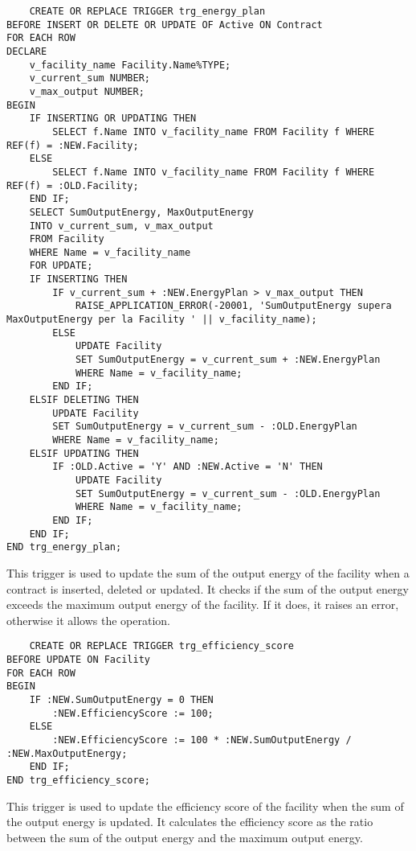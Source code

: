 \begin{lstlisting}
    CREATE OR REPLACE TRIGGER trg_energy_plan
BEFORE INSERT OR DELETE OR UPDATE OF Active ON Contract
FOR EACH ROW
DECLARE
    v_facility_name Facility.Name%TYPE;
    v_current_sum NUMBER;
    v_max_output NUMBER;
BEGIN
    IF INSERTING OR UPDATING THEN
        SELECT f.Name INTO v_facility_name FROM Facility f WHERE REF(f) = :NEW.Facility;
    ELSE
        SELECT f.Name INTO v_facility_name FROM Facility f WHERE REF(f) = :OLD.Facility;
    END IF;
    SELECT SumOutputEnergy, MaxOutputEnergy 
    INTO v_current_sum, v_max_output 
    FROM Facility 
    WHERE Name = v_facility_name 
    FOR UPDATE;
    IF INSERTING THEN
        IF v_current_sum + :NEW.EnergyPlan > v_max_output THEN
            RAISE_APPLICATION_ERROR(-20001, 'SumOutputEnergy supera MaxOutputEnergy per la Facility ' || v_facility_name);
        ELSE
            UPDATE Facility 
            SET SumOutputEnergy = v_current_sum + :NEW.EnergyPlan 
            WHERE Name = v_facility_name;
        END IF;
    ELSIF DELETING THEN
        UPDATE Facility 
        SET SumOutputEnergy = v_current_sum - :OLD.EnergyPlan 
        WHERE Name = v_facility_name;
    ELSIF UPDATING THEN
        IF :OLD.Active = 'Y' AND :NEW.Active = 'N' THEN
            UPDATE Facility 
            SET SumOutputEnergy = v_current_sum - :OLD.EnergyPlan 
            WHERE Name = v_facility_name;
        END IF;
    END IF;
END trg_energy_plan;
\end{lstlisting}

This trigger is used to update the sum of the output energy of the facility when a contract is inserted, deleted or updated. It checks if the sum of the output energy exceeds the maximum output energy of the facility. If it does, it raises an error, otherwise it allows the operation.

\begin{lstlisting}
    CREATE OR REPLACE TRIGGER trg_efficiency_score
BEFORE UPDATE ON Facility
FOR EACH ROW
BEGIN
    IF :NEW.SumOutputEnergy = 0 THEN
        :NEW.EfficiencyScore := 100;
    ELSE
        :NEW.EfficiencyScore := 100 * :NEW.SumOutputEnergy / :NEW.MaxOutputEnergy;
    END IF;
END trg_efficiency_score;
\end{lstlisting}

This trigger is used to update the efficiency score of the facility when the sum of the output energy is updated. It calculates the efficiency score as the ratio between the sum of the output energy and the maximum output energy.

